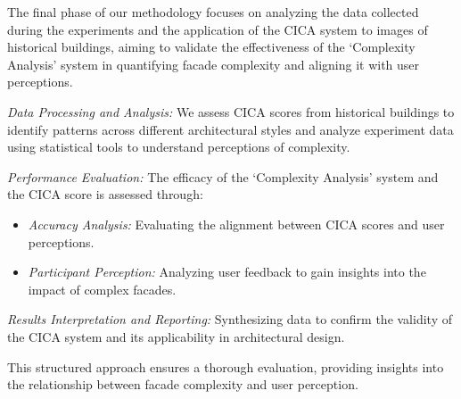 %    

The final phase of our methodology focuses on analyzing the data collected during the experiments and the application of the CICA system to images of historical buildings, aiming to validate the effectiveness of the `Complexity Analysis' system in quantifying facade complexity and aligning it with user perceptions.

\textit{Data Processing and Analysis:} We assess CICA scores from historical buildings to identify patterns across different architectural styles and analyze experiment data using statistical tools to understand perceptions of complexity.

\textit{Performance Evaluation:} The efficacy of the `Complexity Analysis' system and the CICA score is assessed through:
\begin{itemize}
    \item \textit{Accuracy Analysis:} Evaluating the alignment between CICA scores and user perceptions.
    \item \textit{Participant Perception:} Analyzing user feedback to gain insights into the impact of complex facades.
\end{itemize}

\textit{Results Interpretation and Reporting:} Synthesizing data to confirm the validity of the CICA system and its applicability in architectural design.

This structured approach ensures a thorough evaluation, providing insights into the relationship between facade complexity and user perception.
